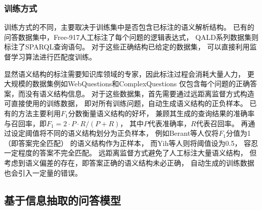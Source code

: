 %

\subsubsection{训练方式}

训练方式的不同，主要取决于训练集中是否包含已标注的语义解析结构。
已有的问答数据集中，Free-917人工标注了每个问题的逻辑表达式，
QALD系列数据集则标注了SPARQL查询语句。
对于这些正确结构已给定的数据集，
可以直接利用监督学习算法进行匹配度训练。

显然语义结构的标注需要知识库领域的专家，因此标注过程会消耗大量人力，
更大规模的数据集例如WebQuestions和ComplexQuestions
仅包含每个问题的正确答案，而没有语义结构信息。
对于这些数据集，首先需要通过远距离监督方式构造可直接使用的训练数据，
即对所有训练问题，自动生成语义结构的正负样本。
已有的方法主要利用$F_1$分数衡量语义结构的好坏，
兼顾其生成的查询结果的准确率与召回率，即$F_1=2 \cdot P \cdot R / (P+R)$，
其中$P$代表准确率，$R$代表召回率。
再通过设定阈值将不同的语义结构划分为正负样本，
例如Berant等人\cite{berant2013semantic}仅将$F_1$分值为1（即答案完全匹配）
的语义结构作为正样本，
而Yih等人\cite{yih2015semantic}则将阈值设为0.5，
容忍一定程度的答案不完全匹配。
远距离监督方式避免了人工标注大量语义结构，
但考虑到语义偏差的存在，即答案正确的语义结构未必正确，
自动生成的训练数据也会引入一定量的错误。


%
%
%
%
%
%
%
%
%




\subsection{基于信息抽取的问答模型}

